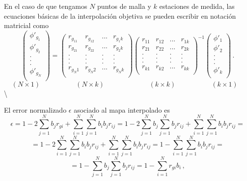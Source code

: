 \documentclass[
]{agujournal2019}
\begin{document}
En el caso de que tengamos \(N\) puntos de malla y \(k\) estaciones de
medida, las ecuaciones básicas de la interpolación objetiva se pueden
escribir en notación matricial como \[\left(\begin{array}{c}
  \phi'_{g_1} \\
  \phi'_{g_2} \\
  . \\
  . \\
  . \\
  \phi'_{g_N} \\
     \end{array}\right)=
\left(\begin{array}{ccccc}
  r_{g_11} & r_{g_12} &... &  r_{g_1k}\\
  r_{g_21} & r_{g_22} &... &  r_{g_2k}\\
  . & . & . & . \\
  . & . & . & . \\
  . & . & . & . \\
  r_{g_N1} & r_{g_N2} & ... & r_{g_Nk}\\
     \end{array}\right)
 \left(\begin{array}{ccccc}
  r_{11} & r_{12} &... &  r_{1k}\\
  r_{21} & r_{22} &... &  r_{2k}\\
  . & . & . & . \\
  . & . & . & . \\
  . & . & . & . \\
  r_{k1} & r_{k2} & ... & r_{kk}\\
     \end{array}\right)^{-1}       \left(\begin{array}{c}
  \phi'_1 \\
  \phi'_2 \\
  . \\
  . \\
  . \\
  \phi'_k \\
     \end{array}\right)
     \,.\]
\[\left( N \times 1 \right)\,\,\,\,\,\,\,\,\,\,\,\,\,\,\,\,\,\,\,\,\,\,\,\,\,\,\,\,\,\,\,
  \left( N \times k \right)\,\,\,\,\,\,\,\,\,\,\,\,\,\,\,\,\,\,\,\,\,\,\,\,\,\,\,\,\,\,\,
  \,\,\,\,\,\,\,\,\left( k \times k \right)\,\,\,\,\,\,\,\,\,\,\,\,\,\,\,\,\,\,\,\,\,\,\,\,\,\,\,\,\,\,\,
  \left( k \times 1 \right)\,\,\,\,\,\] \textbackslash{}

El error normalizado \(\epsilon\) asociado al mapa interpolado es
\[\epsilon=1-2 \sum\limits^N_{j=1} b_j r_{gi} + \sum\limits^N_{i=1}\sum\limits^N_{j=1} b_i b_j r_{ij}=
           1-2 \sum\limits^N_{j=1} b_j \sum\limits^N_{j=1} b_j r_{ij} + \sum\limits^N_{i=1}\sum\limits^N_{j=1} b_i b_j r_{ij}=\]
\[=1-2\sum\limits^N_{i=1}\sum\limits^N_{j=1} b_i b_j r_{ij} + \sum\limits^N_{i=1}\sum\limits^N_{j=1} b_i b_j r_{ij} =1-\sum\limits^N_{i=1}\sum\limits^N_{j=1} b_i b_j r_{ij}=\]
\[= 1- \sum\limits^N_{j=1} b_j \sum\limits^N_{j=1} b_j r_{ij}  =1-\sum\limits^N_{i=1}r_{gi}b_i\,,\]
\end{document}
